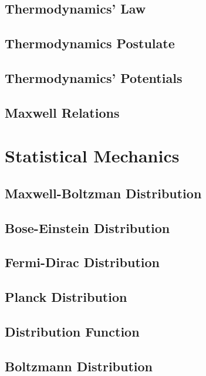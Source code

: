 \documentclass[10pt]{report}
\begin{document}
\section*{Thermodynamics' Law}
\clearpage

\section*{Thermodynamics Postulate}
\clearpage

\section*{Thermodynamics' Potentials}
\clearpage

\section*{Maxwell Relations}
\clearpage

\chapter*{Statistical Mechanics}

\section*{Maxwell-Boltzman Distribution}
\clearpage

\section*{Bose-Einstein Distribution}
\clearpage

\section*{Fermi-Dirac Distribution}
\clearpage

\section*{Planck Distribution}
\clearpage

\section*{Distribution Function}
\clearpage

\section*{Boltzmann Distribution}
\clearpage

\printbibliography
\end{document}

